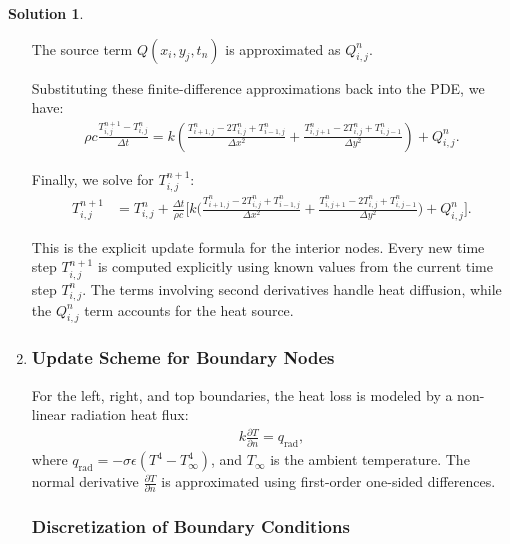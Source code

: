 \documentclass[12pt]{article}
\theoremstyle{definition} %
\newtheorem{solution}{Solution}
\theoremstyle{plain} %
\begin{document}
\begin{solution}
\begin{enumerate}
        \noindent The source term $Q(x_i,y_j,t_n)$ is approximated as $Q_{i,j}^n$.
        
        \noindent Substituting these finite-difference approximations back into the PDE, we have:
        \begin{align}
        \rho c \frac{T_{i,j}^{n+1} - T_{i,j}^n}{\Delta t} = k \left( \frac{T_{i+1,j}^n - 2T_{i,j}^n + T_{i-1,j}^n}{\Delta x^2} + \frac{T_{i,j+1}^n - 2T_{i,j}^n + T_{i,j-1}^n}{\Delta y^2} \right) + Q_{i,j}^n.
        \end{align}
        
        \noindent Finally, we solve for $T_{i,j}^{n+1}$:
        \begin{align}
        T_{i,j}^{n+1} &= T_{i,j}^n + \frac{\Delta t}{\rho c}\bigg[ k\bigg( \frac{T_{i+1,j}^n - 2T_{i,j}^n + T_{i-1,j}^n}{\Delta x^2} + \frac{T_{i,j+1}^n - 2T_{i,j}^n + T_{i,j-1}^n}{\Delta y^2} \bigg) + Q_{i,j}^n \bigg]. \label{eqn7}
        \end{align}
        
        \noindent This is the explicit update formula for the interior nodes. Every new time step $T_{i,j}^{n+1}$ is computed explicitly using known values from the current time step $T_{i,j}^n$. The terms involving second derivatives handle heat diffusion, while the $Q_{i,j}^n$ term accounts for the heat source.

        \item \subsubsection*{Update Scheme for Boundary Nodes}

        For the left, right, and top boundaries, the heat loss is modeled by a non-linear radiation heat flux:
        \begin{align}
        k \frac{\partial T}{\partial n} = q_\text{rad},
        \end{align}
        where $q_\text{rad} = -\sigma \epsilon \left( T^4 - T_\infty^4 \right)$, and $T_\infty$ is the ambient temperature. The normal derivative $\frac{\partial T}{\partial n}$ is approximated using first-order one-sided differences.
        
        \subsubsection*{Discretization of Boundary Conditions}
        

\end{enumerate}
\end{solution}
\end{document}
